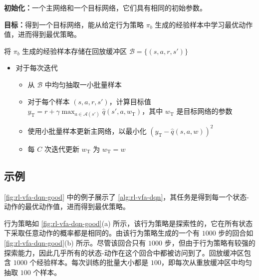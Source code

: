 \begin{algo}
\label{alg:rl-vfa-dqn}
\textbf{初始化：}一个主网络和一个目标网络，它们具有相同的初始参数。

\textbf{目标：}得到一个目标网络，能从给定行为策略 $\pi_{b}$ 生成的经验样本中学习最优动作值，进而得到最优策略。

\smallskip
将 $\pi_b$ 生成的经验样本存储在回放缓冲区 $\mathcal{B} = \{(s,a,r,s')\}$
\begin{itemize}
  \item 对于每次迭代
  \begin{itemize}
    \item 从 $\mathcal{B}$ 中均匀抽取一小批量样本
    \item 对于每个样本 $(s, a, r, s')$，计算目标值 $y_{\mathrm{T}} = r + \gamma \max_{a \in \mathcal{A}(s')} \hat{q}(s', a, w_{\mathrm{T}})$，其中 $w_{\mathrm{T}}$ 是目标网络的参数
    \item 使用小批量样本更新主网络，以最小化 $(y_{\mathrm{T}} - \hat{q}(s,a,w))^{2}$
    \item 每 $C$ 次迭代更新 $w_{\mathrm{T}}$ 为 $w_{\mathrm{T}} = w$
  \end{itemize}
\end{itemize}
\end{algo}

\subsection{示例}
\label{sec:rl-vfa-dqn-example}

\cref{fig:rl-vfa-dqn-good} 中的例子展示了 \cref{alg:rl-vfa-dqn}，其任务是得到每一个状态-动作的最优动作值，进而得到最优策略。

行为策略如 \cref{fig:rl-vfa-dqn-good}(a) 所示，该行为策略是探索性的，它在所有状态下采取任意动作的概率都是相同的。由该行为策略生成的一个有 $1000$ 步的回合如 \cref{fig:rl-vfa-dqn-good}(b) 所示。尽管该回合只有 $1000$ 步，但由于行为策略有较强的探索能力，因此几乎所有的状态-动作在这个回合中都被访问到了。回放缓冲区包含 $1000$ 个经验样本。每次训练的批量大小都是 $100$，即每次从重放缓冲区中均匀抽取 $100$ 个样本。

